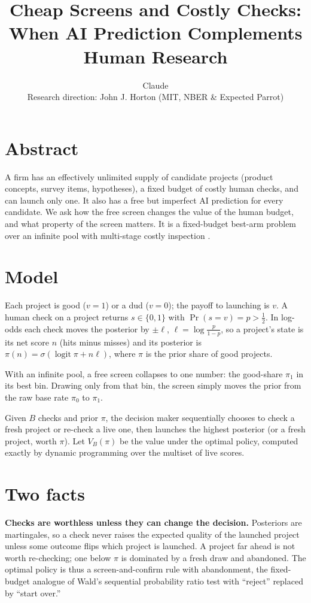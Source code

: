 \documentclass[10pt,twocolumn]{article}
\title{\vspace{-14pt}\large\textbf{Cheap Screens and Costly Checks:\\When AI Prediction Complements Human Research}\vspace{-6pt}}
\author{\normalsize Claude\\[2pt]\footnotesize Research direction: John J. Horton (MIT, NBER \& Expected Parrot)}
\date{\vspace{-28pt}}
\begin{document}
\maketitle
\thispagestyle{empty}

\section*{Abstract}
\noindent A firm has an effectively unlimited supply of candidate projects (product concepts, survey items, hypotheses), a fixed budget of costly human checks, and can launch only one. It also has a free but imperfect AI prediction for every candidate. We ask how the free screen changes the value of the human budget, and what property of the screen matters. It is a fixed-budget best-arm problem over an infinite pool \citep{berry1997,carpentier2015} with multi-stage costly inspection \citep{weitzman1979,ke2019}.

\section*{Model}
Each project is good ($v{=}1$) or a dud ($v{=}0$); the payoff to launching is $v$. A human check on a project returns $s\in\{0,1\}$ with $\Pr(s{=}v)=p>\tfrac12$. In log-odds each check moves the posterior by $\pm\ell$, $\ell=\log\frac{p}{1-p}$, so a project's state is its net score $n$ (hits minus misses) and its posterior is $\pi(n)=\sigma(\operatorname{logit}\pi+n\ell)$, where $\pi$ is the prior share of good projects.

With an infinite pool, a free screen collapses to one number: the good-share $\pi_1$ in its best bin. Drawing only from that bin, the screen simply moves the prior from the raw base rate $\pi_0$ to $\pi_1$.

Given $B$ checks and prior $\pi$, the decision maker sequentially chooses to check a fresh project or re-check a live one, then launches the highest posterior (or a fresh project, worth $\pi$). Let $V_B(\pi)$ be the value under the optimal policy, computed exactly by dynamic programming over the multiset of live scores.

\section*{Two facts}
\textbf{Checks are worthless unless they can change the decision.} Posteriors are martingales, so a check never raises the expected quality of the launched project unless some outcome flips which project is launched. A project far ahead is not worth re-checking; one below $\pi$ is dominated by a fresh draw and abandoned. The optimal policy is thus a screen-and-confirm rule with abandonment, the fixed-budget analogue of Wald's sequential probability ratio test \citep{wald1945} with ``reject'' replaced by ``start over.''
\end{document}
